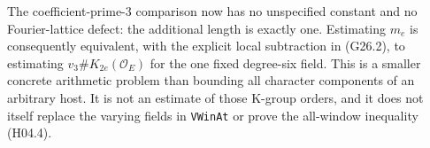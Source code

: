 \begin{remark}
The coefficient-prime-$3$ comparison now has no unspecified
constant and no Fourier-lattice defect: the additional length is
exactly one.  Estimating $m_e$ is consequently equivalent, with
the explicit local subtraction in (G26.2), to estimating
$v_3\#K_{2e}(\mathcal O_E)$ for the one fixed degree-six field.
This is a smaller concrete arithmetic problem than bounding all
character components of an arbitrary host.  It is not an estimate
of those K-group orders, and it does not itself replace the
varying fields in \texttt{VWinAt} or prove the all-window
inequality (H04.4).
\end{remark}
